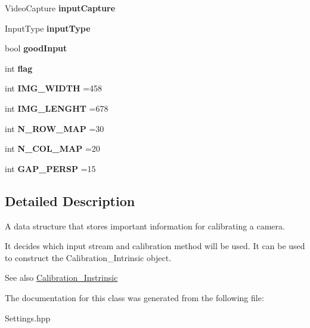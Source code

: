 \begin{DoxyCompactItemize}
Video\+Capture {\bfseries input\+Capture}
\item 
\mbox{\label{class_settings_a89fb14ce9856fb642f18bb0f7c5b8868}} 
Input\+Type {\bfseries input\+Type}
\item 
\mbox{\label{class_settings_a3b9fc27b555f982bd5b9ea5198e1f7e3}} 
bool {\bfseries good\+Input}
\item 
\mbox{\label{class_settings_aba5691e3e76525f93ea254e654ec3717}} 
int {\bfseries flag}
\item 
\mbox{\label{class_settings_a5e8532b46bca347b6fc0336480914544}} 
int {\bfseries I\+M\+G\+\_\+\+W\+I\+D\+TH} =458
\item 
\mbox{\label{class_settings_ab0fe607b4c843f4fff0b1b651fd6bf02}} 
int {\bfseries I\+M\+G\+\_\+\+L\+E\+N\+G\+HT} =678
\item 
\mbox{\label{class_settings_a8cc44bebe159b733449a2b52f99cc264}} 
int {\bfseries N\+\_\+\+R\+O\+W\+\_\+\+M\+AP} =30
\item 
\mbox{\label{class_settings_a1768a2eeed3a80ccf1a9a645b8e9e946}} 
int {\bfseries N\+\_\+\+C\+O\+L\+\_\+\+M\+AP} =20
\item 
\mbox{\label{class_settings_a08b59baafe94e711e02075edc9febfa6}} 
int {\bfseries G\+A\+P\+\_\+\+P\+E\+R\+SP} =15
\end{DoxyCompactItemize}


\subsection{Detailed Description}
A data structure that stores important information for calibrating a camera. 

It decides which input stream and calibration method will be used. It can be used to construct the Calibration\+\_\+\+Intrinsic object. \begin{DoxySeeAlso}{See also}
\mbox{\hyperlink{class_calibration___instrinsic}{Calibration\+\_\+\+Instrinsic}} 
\end{DoxySeeAlso}


The documentation for this class was generated from the following file\+:\begin{DoxyCompactItemize}
\item 
Settings.\+hpp\end{DoxyCompactItemize}
